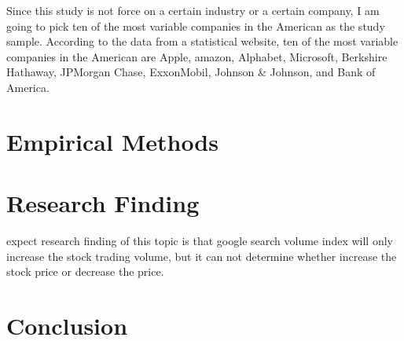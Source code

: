 \documentclass[12pt]{article}
\begin{document}
\newline
Since this study is not force on a certain industry or a certain company, I am going to pick ten of the most variable companies in the American as the study sample. According to the data from a statistical website, ten of the most variable companies in the American are Apple, amazon, Alphabet, Microsoft, Berkshire Hathaway, JPMorgan Chase, ExxonMobil, Johnson & Johnson, and Bank of America.

\section{Empirical Methods}


\section{Research Finding }
expect research finding of this topic is that google search volume index will only increase the stock trading volume, but it can not determine whether increase the stock price or decrease the price.

\section{Conclusion}





    
\newpage



\end{document}
